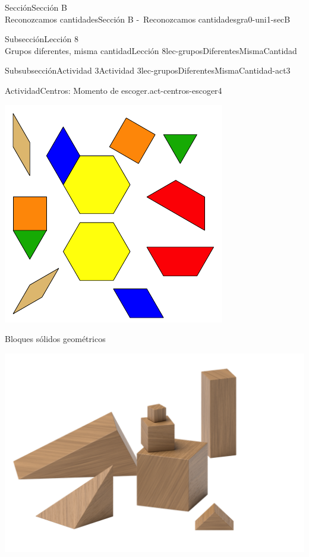 \begin{sectionptx}{Sección}{{\Large Sección B\\}Reconozcamos cantidades}{}{Sección B -~Reconozcamos cantidades}{}{}{gra0-uni1-secB}
\begin{subsectionptx}{Subsección}{{\normalsize Lección 8\\[-0.05cm]}Grupos diferentes, misma cantidad}{}{Lección 8}{}{}{lec-gruposDiferentesMismaCantidad}
\begin{subsubsectionptx}{Subsubsección}{Actividad 3}{}{Actividad 3}{}{}{lec-gruposDiferentesMismaCantidad-act3}
\begin{activity}{Actividad}{Centros: Momento de escoger.}{act-centros-escoger4}
\begin{sidebyside}{2}{0.025}{0.025}{0.05}
\begin{sbspanel}{0.45}
\includegraphics[max width=\linewidth, center]{external/svg-source/tikz-file-147344.pdf}
\end{sbspanel}%
\end{sidebyside}%
\begin{sidebyside}{2}{0.025}{0.025}{0.05}%
\begin{sbspanel}{0.45}%
Bloques sólidos geométricos%
\par
\includegraphics[max width=\linewidth, center]{external/png-source/K.1.A Beta Student Workbook.Geoblocks.png}
\end{sbspanel}%

\end{sidebyside}
\end{activity}
\end{subsubsectionptx}
\end{subsectionptx}
\end{sectionptx}
